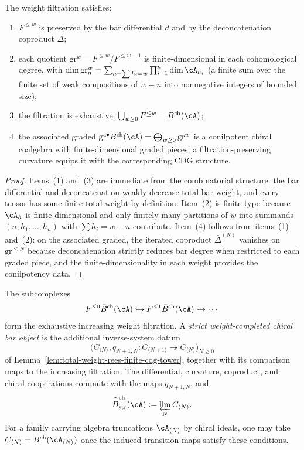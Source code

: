 \begin{lemma}
\label{lem:weight-filtration-basics}
The weight filtration satisfies:
\begin{enumerate}
\item $F^{\leq w}$ is preserved by the bar differential $d$ and by the
 deconcatenation coproduct $\Delta$;
\item each quotient
 $\mathrm{gr}^w = F^{\leq w}/F^{\leq w-1}$
 is finite-dimensional in each cohomological degree, with
 $\dim \mathrm{gr}^w_{n}
 = \sum_{n + \sum h_i = w} \prod_{i=1}^{n} \dim \cA_{h_i}$
 (a finite sum over the finite set of weak compositions of $w-n$ into
 nonnegative integers of bounded size);
\item the filtration is exhaustive:
 $\bigcup_{w \geq 0} F^{\leq w} = \bar{B}^{\mathrm{ch}}(\cA)$;
\item the associated graded
 $\mathrm{gr}^\bullet \bar{B}^{\mathrm{ch}}(\cA)
 = \bigoplus_{w \geq 0} \mathrm{gr}^w$
 is a conilpotent chiral coalgebra with finite-dimensional graded
 pieces; a filtration-preserving curvature equips it with the
 corresponding CDG structure.
\end{enumerate}
\end{lemma}

\begin{proof}
Items~(1) and~(3) are immediate from the combinatorial structure: the
bar differential and deconcatenation weakly decrease total bar weight,
and every tensor has some finite total weight by definition. Item~(2)
is finite-type because $\cA_h$ is finite-dimensional and only
finitely many partitions of $w$ into summands $(n; h_1,\ldots,h_n)$
with $\sum h_i = w - n$ contribute. Item~(4) follows from items~(1)
and~(2): on the associated graded, the iterated coproduct
$\bar{\Delta}^{(N)}$ vanishes on $\mathrm{gr}^{\leq N}$ because
deconcatenation strictly reduces bar degree when restricted to each
graded piece, and the finite-dimensionality in each weight provides
the conilpotency data.
\end{proof}

\begin{definition}
\label{def:weight-completed-bar}
The subcomplexes
\[
 F^{\leq0}\bar B^{\mathrm{ch}}(\cA)
 \hookrightarrow F^{\leq1}\bar B^{\mathrm{ch}}(\cA)
 \hookrightarrow\cdots
\]
form the exhaustive increasing weight filtration.  A
\emph{strict weight-completed chiral bar object} is the additional
inverse-system datum
\[
 \bigl(C_{\langle N\rangle},
 q_{N+1,N}\colon C_{\langle N+1\rangle}\twoheadrightarrow
 C_{\langle N\rangle}\bigr)_{N\geq0}
\]
of Lemma~\ref{lem:total-weight-rees-finite-cdg-tower}, together with
its comparison maps to the increasing filtration.  The differential,
curvature, coproduct, and chiral cooperations commute with the maps
\(q_{N+1,N}\), and
\[
 \widehat{\bar B}^{\mathrm{ch}}_{\mathrm{str}}(\cA)
 :=\varprojlim_N C_{\langle N\rangle}.
\]
For a family carrying algebra truncations
\(\cA_{\langle N\rangle}\) by chiral ideals, one may take
\(C_{\langle N\rangle}=\bar B^{\mathrm{ch}}
(\cA_{\langle N\rangle})\) once the induced transition maps satisfy
these conditions.
\end{definition}

